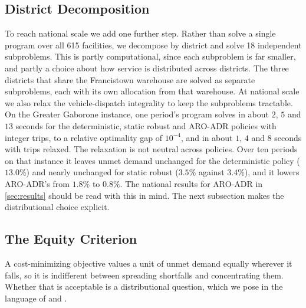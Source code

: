 \documentclass[11pt]{article}
\begin{document}
\subsection{District Decomposition}
\label{sec:decomposition}

To reach national scale we add one further step.
Rather than solve a single program over all 615 facilities, we decompose by district and solve 18 independent subproblems.
This is partly computational, since each subproblem is far smaller, and partly a choice about how service is distributed across districts.
The three districts that share the Francistown warehouse are solved as separate subproblems, each with its own allocation from that warehouse.
At national scale we also relax the vehicle-dispatch integrality to keep the subproblems tractable.
On the Greater Gaborone instance, one period's program solves in about $2$, $5$ and $13$ seconds for the deterministic, static robust and ARO-ADR policies with integer trips, to a relative optimality gap of $10^{-4}$, and in about $1$, $4$ and $8$ seconds with trips relaxed.
The relaxation is not neutral across policies.
Over ten periods on that instance it leaves unmet demand unchanged for the deterministic policy ($13.0\%$) and nearly unchanged for static robust ($3.5\%$ against $3.4\%$), and it lowers ARO-ADR's from $1.8\%$ to $0.8\%$.
The national results for ARO-ADR in \Sec\ref{sec:results} should be read with this in mind.
The next subsection makes the distributional choice explicit.

\subsection{The Equity Criterion}
\label{sec:equity}

A cost-minimizing objective values a unit of unmet demand equally wherever it falls, so it is indifferent between spreading shortfalls and concentrating them.
Whether that is acceptable is a distributional question, which we pose in the language of \citet{bft11} and \citet{bft12}.
\end{document}
